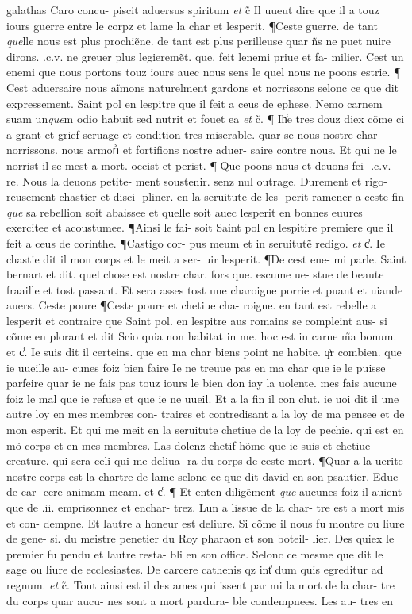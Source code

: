\documentclass{article}
\begin{document}
\begin{pages}
galathas Caro concu- piscit aduersus spiritum \textit{et} c̃ Il uueut dire que il a touz iours guerre entre le corpz et lame la char et lesperit. ¶Ceste guerre. de tant \textit{que}lle nous est plus prochiẽne. de tant est plus perilleuse quar ñs ne puet nuire dirons. .c.v. ne greuer plus legieremẽt. que. feit lenemi priue et fa- milier. Cest un enemi que nous portons touz iours auec nous sens le quel nous ne poons estrie. ¶ Cest aduersaire nous aĩmons naturelment gardons et norrissons selonc ce que dit expressement. Saint pol en lespitre que il feit a ceus de ephese. Nemo carnem suam un\textit{que}m odio habuit sed nutrit et fouet ea \textit{et} c̃. ¶ Ih̾e tres douz diex cõme ci a grant et grief seruage et condition tres miserable. quar se nous nostre char norrissons. nous armonᷤ et fortifions nostre aduer- saire contre nous. Et qui ne le norrist il se mest a mort. occist et perist. ¶ Que poons nous et deuons fei- .c.v. re. Nous la deuons petite- ment soustenir. senz nul outrage. Durement et rigo- reusement chastier et disci- pliner. en la seruitute de les- perit ramener a ceste fin \textit{que} sa rebellion soit abaissee et quelle soit auec lesperit en bonnes euures exercitee et acoustumee. ¶Ainsi le fai- soit Saint pol en lespitire premiere que il feit a ceus de corinthe. ¶Castigo cor- pus meum et in seruitutẽ redigo. \textit{et} c̾. Ie chastie dit il mon corps et le meit a ser- uir lesperit. ¶De cest ene- mi parle. Saint bernart et dit. quel chose est nostre char. fors que. escume ue- stue de beaute fraaille et tost passant. Et sera asses tost une charoigne porrie et puant et uiande auers. Ceste poure ¶Ceste poure et chetiue cha- roigne. en tant est rebelle a lesperit et contraire que Saint pol. en lespitre aus romains se compleint aus- si cõme en plorant et dit Scio quia non habitat in me. hoc est in carne m̃a bonum. et c̾. Ie suis dit il certeins. que en ma char biens point ne habite. qͣr combien. que ie uueille au- cunes foiz bien faire Ie ne treuue pas en ma char que ie le puisse parfeire quar ie ne fais pas touz iours le bien don iay la uolente. mes fais aucune foiz le mal que ie refuse et que ie ne uueil. Et a la fin il con clut. ie uoi dit il une autre loy en mes membres con- traires et contredisant a la loy de ma pensee et de mon esperit. Et qui me meit en la seruitute chetiue de la loy de pechie. qui est en mõ corps et en mes membres. Las dolenz chetif hõme que ie suis et chetiue creature. qui sera celi qui me deliua- ra du corps de ceste mort. ¶Quar a la uerite nostre corps est la chartre de lame selonc ce que dit david en son psautier. Educ de car- cere animam meam. et c̾. ¶ Et enten diligẽment \textit{que} aucunes foiz il auient que de .ii. emprisonnez et enchar- trez. Lun a lissue de la char- tre est a mort mis et con- dempne. Et lautre a honeur est deliure. Si cõme il nous fu montre ou liure de gene- si. du meistre penetier du Roy pharaon et son boteil- lier. Des quiex le premier fu pendu et lautre resta- bli en son office. Selonc ce mesme que dit le sage ou liure de ecclesiastes. De carcere cathenis qz int̾ dum quis egreditur ad regnum. \textit{et} c̃. Tout ainsi est il des ames qui issent par mi la mort de la char- tre du corps quar aucu- nes sont a mort pardura- ble condempnees. Les au- tres en 
\end{pages}
\end{document}

